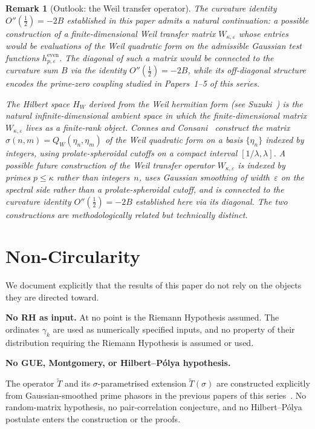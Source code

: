 \documentclass[11pt]{article}
\newtheorem*{remark}{Remark}
\newcommand{\Tt}{\widetilde{T}}
\begin{document}
\begin{remark}[Outlook: the Weil transfer operator]
\label{rem:weil-transfer-outlook}
The curvature identity $O''(\tfrac12)=-2B$ established in this
paper admits a natural continuation: a possible construction of a
finite-dimensional Weil transfer matrix $W_{\kappa,\varepsilon}$
whose entries would be evaluations of the Weil quadratic form on the
admissible Gaussian test functions $h^{\mathrm{even}}_{p,\varepsilon}$.
The diagonal of such a matrix would be connected to the
curvature sum $B$ via the identity $O''(\tfrac12)=-2B$, while
its off-diagonal structure encodes the prime-zero coupling studied
in Papers~1--5 of this series.

The Hilbert space $H_W$ derived from the Weil hermitian form
(see Suzuki~\cite{Suzuki25}) is the natural infinite-dimensional
ambient space in which the finite-dimensional matrix
$W_{\kappa,\varepsilon}$ lives as a finite-rank object.
Connes and Consani~\cite{ConnesConsani23} construct the
matrix $\sigma(n,m) = Q_W(\eta_n,\eta_m)$ of the Weil quadratic
form on a basis $\{\eta_n\}$ indexed by integers, using
prolate-spheroidal cutoffs on a compact interval $[1/\lambda,\lambda]$.
A possible future construction of the Weil
transfer operator $W_{\kappa,\varepsilon}$
is indexed by primes
$p\le\kappa$ rather than integers~$n$, uses Gaussian smoothing
of width~$\varepsilon$ on the spectral side rather than a
prolate-spheroidal cutoff, and is connected to the curvature
identity $O''(\tfrac12)=-2B$ established here via its diagonal.
The two constructions are methodologically related but technically
distinct.
\end{remark}

\section*{Non-Circularity}
\label{sec:nocirc}

We document explicitly that the results of this paper do not rely on
the objects they are directed toward.

\textbf{No RH as input.}
At no point is the Riemann Hypothesis assumed.
The ordinates $\gamma_k$ are used as numerically specified inputs, and
no property of their distribution requiring the Riemann Hypothesis is
assumed or used.

\textbf{No GUE, Montgomery, or Hilbert--P\'olya hypothesis.}
{\sloppy
The operator $\Tt$ and its $\sigma$-parametrised extension
$\Tt(\sigma)$ are constructed explicitly from Gaussian-smoothed prime
phasors in the previous papers of this series~\cite{Paper3,Paper4,Paper5}.
No random-matrix hypothesis, no pair-correlation conjecture, and no
Hilbert--P\'olya postulate enters the construction or the proofs.
\par}
\end{document}
